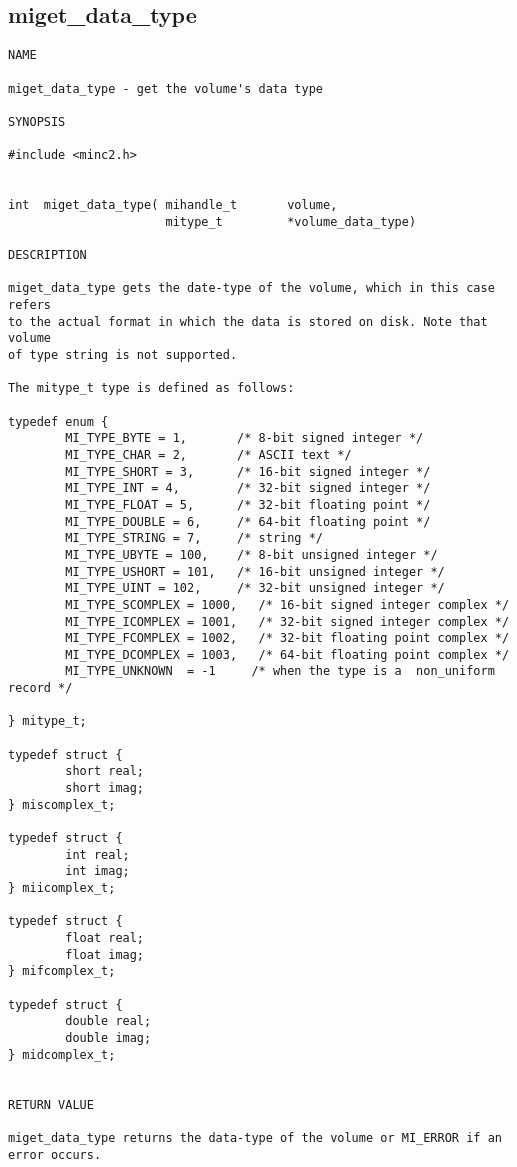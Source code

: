 \documentclass{article}
\begin{document}
\subsection{miget\_data\_type}
\begin{verbatim}
NAME

miget_data_type - get the volume's data type

SYNOPSIS

#include <minc2.h>


int  miget_data_type( mihandle_t       volume,
                      mitype_t         *volume_data_type)

DESCRIPTION

miget_data_type gets the date-type of the volume, which in this case refers
to the actual format in which the data is stored on disk. Note that volume
of type string is not supported.

The mitype_t type is defined as follows:

typedef enum {
        MI_TYPE_BYTE = 1,       /* 8-bit signed integer */
        MI_TYPE_CHAR = 2,       /* ASCII text */
        MI_TYPE_SHORT = 3,      /* 16-bit signed integer */
        MI_TYPE_INT = 4,        /* 32-bit signed integer */
        MI_TYPE_FLOAT = 5,      /* 32-bit floating point */
        MI_TYPE_DOUBLE = 6,     /* 64-bit floating point */
        MI_TYPE_STRING = 7,     /* string */
        MI_TYPE_UBYTE = 100,    /* 8-bit unsigned integer */
        MI_TYPE_USHORT = 101,   /* 16-bit unsigned integer */
        MI_TYPE_UINT = 102,     /* 32-bit unsigned integer */
        MI_TYPE_SCOMPLEX = 1000,   /* 16-bit signed integer complex */
        MI_TYPE_ICOMPLEX = 1001,   /* 32-bit signed integer complex */
        MI_TYPE_FCOMPLEX = 1002,   /* 32-bit floating point complex */
        MI_TYPE_DCOMPLEX = 1003,   /* 64-bit floating point complex */
        MI_TYPE_UNKNOWN  = -1     /* when the type is a  non_uniform record */

} mitype_t;

typedef struct {
        short real;
        short imag;
} miscomplex_t;

typedef struct {
        int real;
        int imag;
} miicomplex_t;

typedef struct {
        float real;
        float imag;
} mifcomplex_t;

typedef struct {
        double real;
        double imag;
} midcomplex_t;


RETURN VALUE

miget_data_type returns the data-type of the volume or MI_ERROR if an
error occurs.
\end{verbatim}
\end{document}
